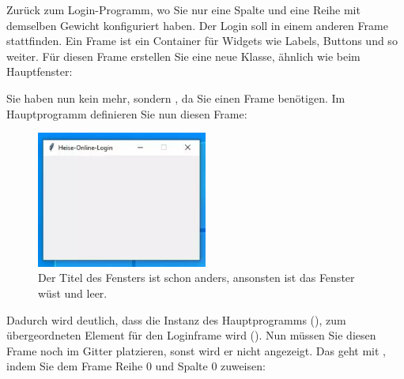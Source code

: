 Zurück zum Login-Programm, wo Sie nur eine Spalte und eine Reihe mit demselben Gewicht konfiguriert haben. Der Login soll in einem anderen Frame stattfinden. Ein Frame ist ein Container für Widgets wie Labels, Buttons und so weiter. Für diesen Frame erstellen Sie eine neue Klasse, ähnlich wie beim Hauptfenster:

\medskip



\PYTHON{}



\medskip


Sie haben nun kein  mehr, sondern , da Sie einen Frame benötigen. Im Hauptprogramm definieren Sie nun diesen Frame:

\medskip


\medskip


\begin{figure}
    \includegraphics[width=0.5\textwidth]{Images/TKinter/TkinterFrame}
    \caption{Der Titel des Fensters ist schon anders, ansonsten ist das Fenster wüst und leer.} \label{TkinterFrame}
\end{figure}


Dadurch wird deutlich, dass die Instanz des Hauptprogramms (), zum übergeordneten Element für den Loginframe wird (). Nun müssen Sie diesen Frame noch im Gitter platzieren, sonst wird er nicht angezeigt. Das geht mit , indem Sie dem Frame Reihe 0 und Spalte 0 zuweisen:


\medskip


\medskip

